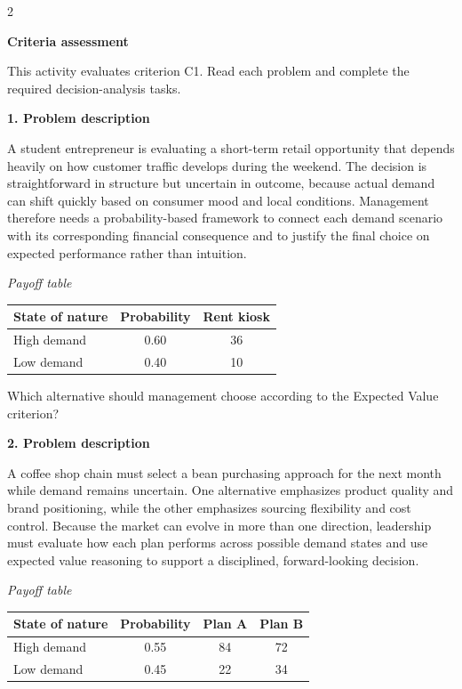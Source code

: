 \documentclass[12pt]{article}
\newcommand{\SubsectionBox}[1]{%
	\noindent\colorbox{gray!30}{%
		\parbox{\linewidth}{\textbf{#1}}%
	}\par\vspace{0.35cm}%
}
\begin{document}
	\begin{multicols}{2}
		\SubsectionBox{Criteria assessment}\vspace{-0.25cm}
		This activity evaluates criterion C1. Read each problem and complete the required decision-analysis tasks.

		\vspace{0.25cm}
		\SubsectionBox{1. Problem description}\vspace{-0.25cm}
		A student entrepreneur is evaluating a short-term retail opportunity that depends heavily on how customer traffic develops during the weekend. The decision is straightforward in structure but uncertain in outcome, because actual demand can shift quickly based on consumer mood and local conditions. Management therefore needs a probability-based framework to connect each demand scenario with its corresponding financial consequence and to justify the final choice on expected performance rather than intuition.
		
				\begin{center}
					\textit{Payoff table} \par
					\begin{tabular}{l c c}
						\toprule
						State of nature & Probability & Rent kiosk \\
						\midrule
						High demand & 0.60 & 36 \\
						Low demand & 0.40 & 10 \\
						\bottomrule
					\end{tabular}
				\end{center}
		
				Which alternative should management choose according to the Expected Value criterion?

		\vspace{0.25cm}
		\SubsectionBox{2. Problem description}\vspace{-0.25cm}
		A coffee shop chain must select a bean purchasing approach for the next month while demand remains uncertain. One alternative emphasizes product quality and brand positioning, while the other emphasizes sourcing flexibility and cost control. Because the market can evolve in more than one direction, leadership must evaluate how each plan performs across possible demand states and use expected value reasoning to support a disciplined, forward-looking decision.
		
				\begin{center}
					\textit{Payoff table} \par
					\begin{tabular}{l c c c}
						\toprule
						State of nature & Probability & Plan A & Plan B \\
						\midrule
						High demand & 0.55 & 84 & 72 \\
						Low demand & 0.45 & 22 & 34 \\
						\bottomrule
					\end{tabular}
				\end{center}
		

\end{multicols}
\end{document}
